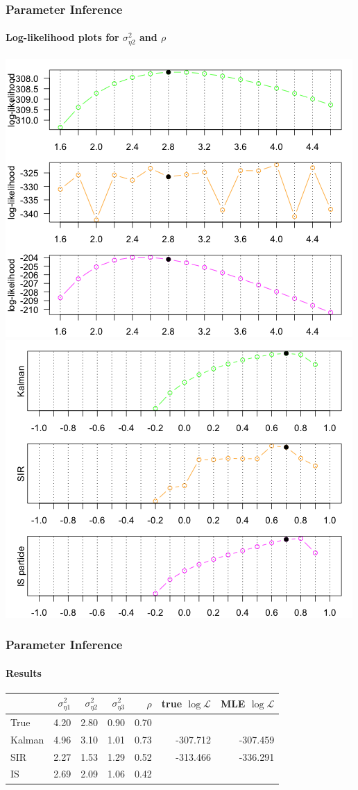 \documentclass[11pt]{beamer}
\begin{document}
\begin{frame}
\frametitle{Parameter Inference}
\framesubtitle{Log-likelihood plots for $\sigma_{\eta 2}^2$ and $\rho$}
\centering
\includegraphics[scale=0.30]{mllm-loglik-var2}
\includegraphics[scale=0.30]{mllm-loglik-rho}
\end{frame}

\begin{frame}
\frametitle{Parameter Inference}
\framesubtitle{Results}
\begin{table}
\centering
\begin{tabular}{l r r r r r r}
\hline
& $\sigma_{\eta 1}^2$ &  $\sigma_{\eta 2}^2$ & $\sigma_{\eta 3}^2$ & $\rho$ & true $\log \mathcal{L} $ & MLE $\log \mathcal{L} $ \\
\hline
True        & 4.20  & 2.80 &  0.90 & 0.70&  &  \\
Kalman   & 4.96  & 3.10  & 1.01 & 0.73 & -307.712 & -307.459 \\
SIR         & 2.27  & 1.53  & 1.29 & 0.52 & -313.466 & -336.291 \\
IS            & 2.69  & 2.09  & 1.06 & 0.42 &  & \\
\hline
\end{tabular}
\end{table}
\end{frame}
\end{document}
